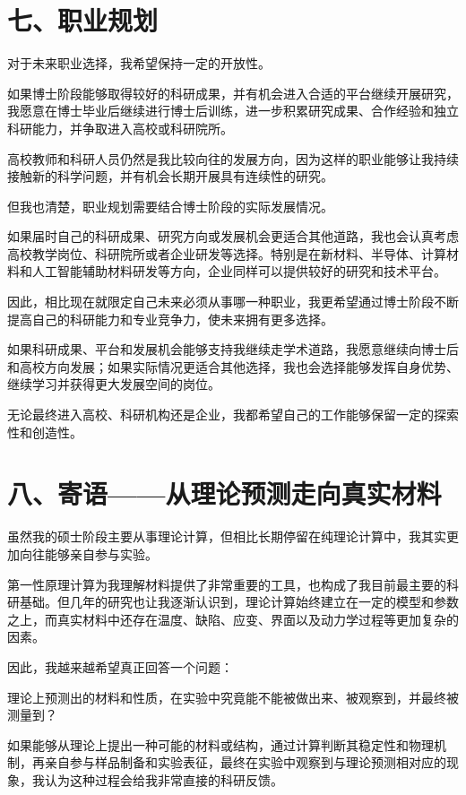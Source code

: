 \section{七、职业规划}

对于未来职业选择，我希望保持一定的开放性。

如果博士阶段能够取得较好的科研成果，并有机会进入合适的平台继续开展研究，我愿意在博士毕业后继续进行博士后训练，进一步积累研究成果、合作经验和独立科研能力，并争取进入高校或科研院所。

高校教师和科研人员仍然是我比较向往的发展方向，因为这样的职业能够让我持续接触新的科学问题，并有机会长期开展具有连续性的研究。

但我也清楚，职业规划需要结合博士阶段的实际发展情况。

如果届时自己的科研成果、研究方向或发展机会更适合其他道路，我也会认真考虑高校教学岗位、科研院所或者企业研发等选择。特别是在新材料、半导体、计算材料和人工智能辅助材料研发等方向，企业同样可以提供较好的研究和技术平台。

因此，相比现在就限定自己未来必须从事哪一种职业，我更希望通过博士阶段不断提高自己的科研能力和专业竞争力，使未来拥有更多选择。

如果科研成果、平台和发展机会能够支持我继续走学术道路，我愿意继续向博士后和高校方向发展；如果实际情况更适合其他选择，我也会选择能够发挥自身优势、继续学习并获得更大发展空间的岗位。

无论最终进入高校、科研机构还是企业，我都希望自己的工作能够保留一定的探索性和创造性。

\section{八、寄语——从理论预测走向真实材料}

虽然我的硕士阶段主要从事理论计算，但相比长期停留在纯理论计算中，我其实更加向往能够亲自参与实验。

第一性原理计算为我理解材料提供了非常重要的工具，也构成了我目前最主要的科研基础。但几年的研究也让我逐渐认识到，理论计算始终建立在一定的模型和参数之上，而真实材料中还存在温度、缺陷、应变、界面以及动力学过程等更加复杂的因素。

因此，我越来越希望真正回答一个问题：

理论上预测出的材料和性质，在实验中究竟能不能被做出来、被观察到，并最终被测量到？

如果能够从理论上提出一种可能的材料或结构，通过计算判断其稳定性和物理机制，再亲自参与样品制备和实验表征，最终在实验中观察到与理论预测相对应的现象，我认为这种过程会给我非常直接的科研反馈。

